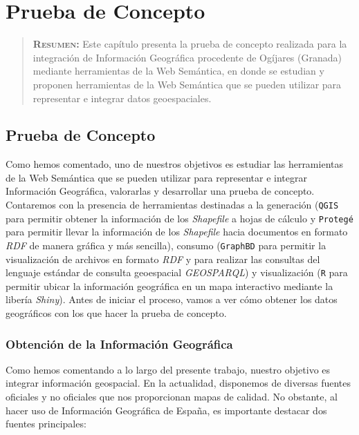 \chapter{Prueba de Concepto}
\label{ch:aplicacion}

\begin{quote}
	{\bf\textsc{Resumen:}} Este capítulo presenta la prueba de concepto realizada para la integración de Información Geográfica procedente de Ogíjares (Granada) mediante herramientas de la Web Semántica, en donde se estudian y proponen herramientas de la Web Semántica que se pueden utilizar para representar e integrar datos geoespaciales. 
\end{quote}



\section{Prueba de Concepto}

Como hemos comentado, uno de nuestros objetivos es estudiar las herramientas de la Web Semántica que se pueden utilizar para representar e integrar Información Geográfica, valorarlas y desarrollar una prueba de concepto. Contaremos con la presencia de herramientas destinadas a la generación (\texttt{QGIS} para permitir obtener la información de los \textit{Shapefile} a hojas de cálculo y \texttt{Protegé} para permitir llevar la información de los \textit{Shapefile} hacia documentos en formato \textit{RDF} de manera gráfica y más sencilla), consumo (\texttt{GraphBD} para permitir la visualización de archivos en formato \textit{RDF} y para realizar las consultas del lenguaje estándar de consulta geoespacial \textit{GEOSPARQL}) y visualización (\texttt{R} para permitir ubicar la información geográfica en un mapa interactivo mediante la libería \textit{Shiny}). Antes de iniciar el proceso, vamos a ver cómo obtener los datos geográficos con los que hacer la prueba de concepto.

\subsection{Obtención de la Información Geográfica}

Como hemos comentando a lo largo del presente trabajo, nuestro objetivo es integrar información geospacial. En la actualidad, disponemos de diversas fuentes oficiales y no oficiales que nos proporcionan mapas de calidad. No obstante, al hacer uso de Información Geográfica de España, es importante destacar dos fuentes principales:

